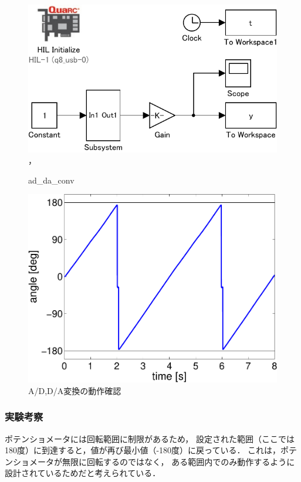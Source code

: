 \begin{figure}[h]
  \centering
  \includegraphics[scale=1]{sozai/ad_da_conv-crop.pdf}，
  \caption{ad\_da\_conv}
\end{figure}

\begin{figure}[h]
  \centering
  \includegraphics[scale=0.5]{sozai/figure_ad_da-crop.pdf}
  \caption{A/D,D/A変換の動作確認}
\end{figure}

\subsubsection{実験考察}
ポテンショメータには回転範囲に制限があるため，
設定された範囲（ここでは180度）に到達すると，値が再び最小値（-180度）に戻っている．
これは，ポテンショメータが無限に回転するのではなく，
ある範囲内でのみ動作するように設計されているためだと考えられている．

